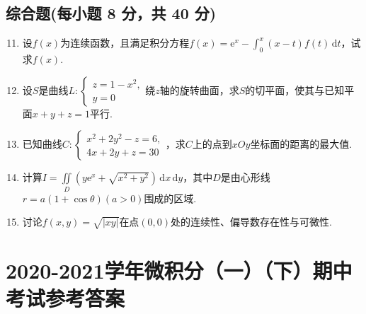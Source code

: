 \documentclass[../main.tex]{subfiles}
\begin{document}
\section{综合题(每小题 8 分，共 40 分)}
\begin{enumerate}
    \setcounter{enumi}{10}
    \item 设$f(x)$为连续函数，且满足积分方程$f(x)=\mathrm{e}^{x}-\int_{0}^{x}
              (x-t)f(t)\,\mathrm{d}t$，试求$f(x)$.
          \vspace{12em}

    \item 设$S$是曲线$L:
              \begin{cases}
                  z=1-x^{2}, \\
                  y=0
              \end{cases}$绕$z$轴的旋转曲面，求$S$的切平面，使其与已知平面$x+y+z=1$平行.
          \vspace{12em}

    \item 已知曲线$C:
              \begin{cases}
                  x^{2}+2y^{2}-z=6, \\
                  4x+2y+z=30
              \end{cases}$，求$C$上的点到$xOy$坐标面的距离的最大值.
          \vspace{12em}

    \item 计算$I=\iint\limits_{D}\left(y\mathrm{e}^{x}+\sqrt{x^{2}+y^{2}}\right
              )\,\mathrm{d}x\,\mathrm{d}y$，其中$D$是由心形线$r=a\left(1+\cos\theta\right)(a>
              0)$围成的区域.
          \vspace{12em}

    \item 讨论$f(x,y)=\sqrt{|xy|}$在点$(0,0)$处的连续性、偏导数存在性与可微性.
          \vspace{12em}
\end{enumerate}

\chapter{2020-2021学年微积分（一）（下）期中考试参考答案}
\end{document}
